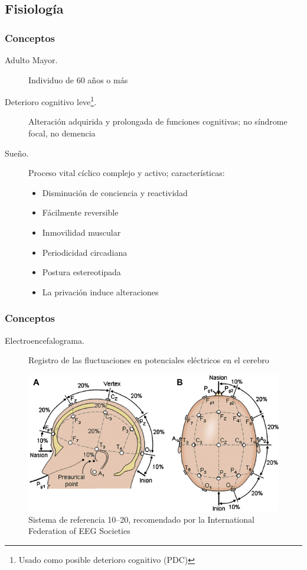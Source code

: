 \documentclass{beamer}
\begin{document}

\subsection{Fisiolog\'ia}

\begin{frame}\frametitle{Conceptos}
\begin{description}
\item[Adulto Mayor.] Individuo de 60 a\~nos o m\'as %

\item[Deterioro cognitivo leve\footnote{Usado como posible deterioro cognitivo (PDC)}.] 
Alteraci\'on adquirida y prolongada de funciones cognitivas; no s\'indrome focal, no demencia 
\item[Sue\~no.] Proceso vital c\'iclico complejo y activo; caracter\'isticas:%
\begin{itemize}
\item Disminuci\'on de conciencia y reactividad
\item F\'acilmente reversible
\item Inmovilidad muscular
\item Periodicidad circadiana
\item Postura estereotipada
\item La privaci\'on induce alteraciones
\end{itemize}
\end{description}
\end{frame}


\begin{frame}\frametitle{Conceptos}
\begin{description}
\item[Electroencefalograma.] Registro de las fluctuaciones en potenciales el\'ectricos en el 
cerebro
\end{description}
\begin{figure}
\centering
\includegraphics[width=0.6\linewidth]{Fig.png} 
\caption{Sistema de referencia 10--20, recomendado por la
International Federation of EEG Societies
}
\label{img1020}
\end{figure}
\end{frame}
\end{document}
